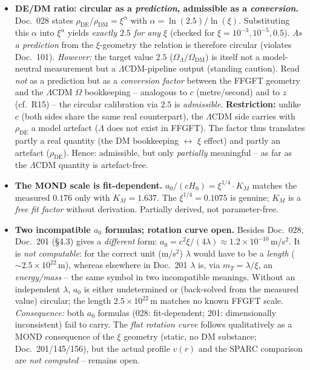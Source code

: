 \begin{itemize}
  \item \textbf{DE/DM ratio: circular as a \emph{prediction}, admissible as a
        \emph{conversion}.} Doc.~028 states $\rho_{\text{DE}}/\rho_{\text{DM}} =
        \xi^{\alpha}$ with $\alpha = \ln(2.5)/\ln(\xi)$. Substituting this
        $\alpha$ into $\xi^{\alpha}$ yields \emph{exactly $2.5$ for any $\xi$}
        (checked for $\xi = 10^{-3}, 10^{-5}, 0.5$). \emph{As a prediction} from
        the $\xi$-geometry the relation is therefore circular (violates
        Doc.~101). \emph{However:} the target value $2.5$
        ($\Omega_\Lambda/\Omega_{\text{DM}}$) is itself not a model-neutral
        measurement but a $\Lambda$CDM-pipeline output (standing caution).
        Read \emph{not} as a prediction but as a \emph{conversion factor}
        between the FFGFT geometry and the $\Lambda$CDM $\Omega$ bookkeeping --
        analogous to $c$ (metre/second) and to $z$ (cf.\ R15) -- the circular
        calibration via $2.5$ is \emph{admissible}. \textbf{Restriction:} unlike
        $c$ (both sides share the same real counterpart), the $\Lambda$CDM side
        carries with $\rho_{\text{DE}}$ a model artefact ($\Lambda$ does not
        exist in FFGFT). The factor thus translates partly a real quantity (the
        DM bookkeeping $\leftrightarrow$ $\xi$ effect) and partly an artefact
        ($\rho_{\text{DE}}$). Hence: admissible, but only \emph{partially}
        meaningful -- as far as the $\Lambda$CDM quantity is artefact-free.
  \item \textbf{The MOND scale is fit-dependent.} $a_0/(cH_0) =
        \xi^{1/4}\cdot K_M$ matches the measured $0.176$ only with
        $K_M = 1.637$. The $\xi^{1/4} = 0.1075$ is genuine; $K_M$ is a
        \emph{free fit factor} without derivation. Partially derived, not
        parameter-free.
  \item \textbf{Two incompatible $a_0$ formulas; rotation curve open.}
        Besides Doc.~028, Doc.~201 (§4.3) gives a \emph{different} form:
        $a_0 = c^2\xi/(4\lambda)\approx 1.2\times10^{-10}$\,m/s$^2$. It is
        \emph{not computable}: for the correct unit (m/s$^2$) $\lambda$ would
        have to be a \emph{length} ($\sim 2.5\times10^{22}$\,m), whereas
        elsewhere in Doc.~201 $\lambda$ is, via $m_T=\lambda/\xi$, an
        \emph{energy/mass} -- the same symbol in two incompatible meanings.
        Without an independent $\lambda$, $a_0$ is either undetermined or
        (back-solved from the measured value) circular; the length
        $2.5\times10^{22}$\,m matches no known FFGFT scale. \emph{Consequence:}
        both $a_0$ formulas (028: fit-dependent; 201: dimensionally
        inconsistent) fail to carry. The \emph{flat rotation curve} follows
        qualitatively as a MOND consequence of the $\xi$ geometry (static, no DM
        substance; Doc.~201/145/156), but the actual profile $v(r)$ and the
        SPARC comparison are \emph{not computed} -- remains open.
\end{itemize}

